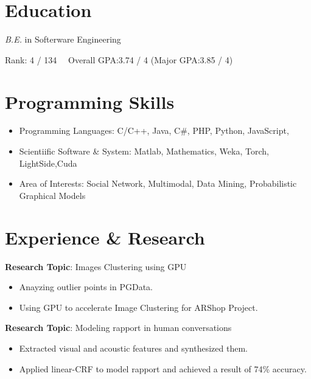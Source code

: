 \documentclass{resume}
\begin{document}




% 
% 
\section{Education}

\textit{B.E.} in Softerware Engineering

Rank: 4 / 134 \ \  Overall GPA:3.74 / 4 (Major GPA:3.85 / 4)


%
%


\section{Programming Skills}
\begin{itemize}[parsep=0.5ex]
  \item Programming Languages: C/C++, Java, C\#, PHP, Python, JavaScript, 
  \item Scientiific Software \& System: Matlab, Mathematics, Weka, Torch, LightSide,Cuda
  \item Area of Interests: Social Network, Multimodal, Data Mining, Probabilistic Graphical Models
\end{itemize}


%
%



\section{Experience \& Research}

\textbf{Research Topic}: Images Clustering using GPU
\begin{itemize}
	\item Anayzing outlier points in PGData.
	\item Using GPU to accelerate Image Clustering for ARShop Project.
\end{itemize}


\textbf{Research Topic}:  Modeling rapport in human conversations
\begin{itemize}
  \item Extracted visual and acoustic features and synthesized them.
  \item Applied linear-CRF to model rapport and achieved a result of 74\% accuracy.
\end{itemize}
\end{document}
